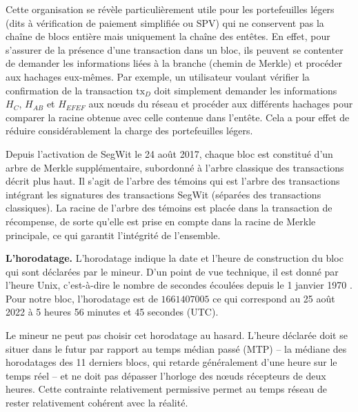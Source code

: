 Cette organisation se révèle particulièrement utile pour les portefeuilles légers (dits à vérification de paiement simplifiée ou SPV) qui ne conservent pas la chaîne de blocs entière mais uniquement la chaîne des entêtes. En effet, pour s'assurer de la présence d'une transaction dans un bloc, ils peuvent se contenter de demander les informations liées à la branche (chemin de Merkle) et procéder aux hachages eux-mêmes. Par exemple, un utilisateur voulant vérifier la confirmation de la transaction $\mathrm{tx}_D$ doit simplement demander les informations $H_C$, $H_{A\!B}$ et $H_{E\!F\!E\!F}$ aux nœuds du réseau et procéder aux différents hachages pour comparer la racine obtenue avec celle contenue dans l'entête. Cela a pour effet de réduire considérablement la charge des portefeuilles légers.

Depuis l'activation de SegWit le 24 août 2017, chaque bloc est constitué d'un arbre de Merkle supplémentaire, subordonné à l'arbre classique des transactions décrit plus haut. Il s'agit de l'arbre des témoins qui est l'arbre des transactions intégrant les signatures des transactions SegWit (séparées des transactions classiques). La racine de l'arbre des témoins est placée dans la transaction de récompense, de sorte qu'elle est prise en compte dans la racine de Merkle principale, ce qui garantit l'intégrité de l'ensemble.


\textbf{L'horodatage.} L'horodatage indique la date et l'heure de construction du bloc qui sont déclarées par le mineur. D'un point de vue technique, il est donné par l'heure Unix, c'est-à-dire le nombre de secondes écoulées depuis le 1\ier{} janvier 1970 . Pour notre bloc, l'horodatage est de $1661407005$ ce qui correspond au 25 août 2022 à 5 heures 56 minutes et 45 secondes (UTC).

Le mineur ne peut pas choisir cet horodatage au hasard. L'heure déclarée doit se situer dans le futur par rapport au temps médian passé (MTP) -- la médiane des horodatages des 11 derniers blocs, qui retarde généralement d'une heure sur le temps réel -- et ne doit pas dépasser l'horloge des nœuds récepteurs de deux heures. Cette contrainte relativement permissive permet au temps réseau de rester relativement cohérent avec la réalité.

